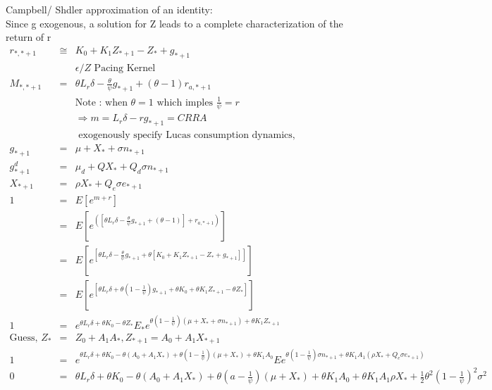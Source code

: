 \documentclass[]{article}
\begin{document}
Campbell/ Shdler approximation of an identity:\\
Since g exogenous, a solution for Z leads to a complete characterization of the return of r
\begin{eqnarray*}
r_{*, *+1} &\cong & K_0 + K_1 Z_{*+1} - Z_* + g_{*+1}\\
&& \epsilon / Z \mbox{ Pacing Kernel } \\
M_{*,*+1} &=& \theta L_r \delta - \frac{\theta}{\psi} g_{*+1} + \left(\theta -1\right)r_{a, *+1}\\
&& \mbox{Note : when } \theta = 1 \mbox{ which imples } \frac{1}{\psi} = r\\
&& \Rightarrow m = L_r \delta - r g_{*+1} = CRRA\\
&& \mbox{ exogenously specify Lucas consumption dynamics, }\\
g_{*+1} &=& \mu + X_* + \sigma n_{*+1}\\
g_{*+1} ^ d &=& \mu _d + Q X_* + Q_d \sigma n_{*+1}\\
X_{*+1} &=& \rho X_* + Q_e \sigma e_{*+1}\\
1 &=& E \left[ e^{m+r} \right]\\
&=& E \left[ e^{ \left( \left[ \theta L_r \delta - \frac{\theta}{\psi} g_{*+1} + \left( \theta -1 \right) \right] + r_{a, *+1} \right)} \right]\\
&=& E \left[ e^{ \left[ \theta L_r \delta - \frac{\theta}{\psi} g_{*+1} + \theta \left[ K_0 + K_1 Z_{*+1} - Z_* + g_{*+1}\right] \right]} \right]\\
&=& E \left[ e^{ \left[ \theta L_r \delta + \theta \left( 1 - \frac{1}{\psi}\right) g_{*+1} + \theta K_0 + \theta K_1 Z_{*+1} -\theta Z_* \right] } \right]\\
1&=& e^{\theta L_r \delta + \theta K_0 - \theta Z_*} E_* e^{\theta \left(1-\frac{1}{\psi}\right)\left( \mu + X_* + \sigma n_{*+1} \right) + \theta K_1 Z_{*+1}}\\
\mbox{Guess, } Z_* &=& Z_0 + A_1 A_*, Z_{*+1} = A_0 + A_1 X_{*+1}\\
1&=& e^{\theta L_r \delta + \theta K_0 - \theta \left(A_0 + A_1 X_*\right) + \theta \left(1-\frac{1}{\psi}\right)\left(\mu + X_*\right) + \theta K_1 A_0} E e^{\theta \left(1-\frac{1}{\psi}\right)\sigma n_{*+1} + \theta K_1 A_1 \left(\rho X_* + Q_e \sigma e_{*+1}\right)}\\
0&=& \theta L_r \delta + \theta K_0 - \theta \left(A_0 + A_1 X_*\right) + \theta \left(a-\frac{1}{\psi}\right)\left(\mu + X_*\right) + \theta K_1 A_0 +\theta K_1 A_1 \rho X_* + \frac{1}{2} \theta ^2 \left(1-\frac{1}{\psi}\right)^2 \sigma ^2 \\

\end{eqnarray*}
\end{document}

